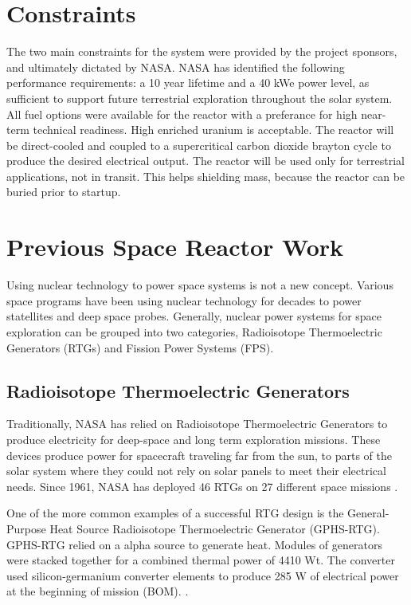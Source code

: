 \section{Constraints}
The two main constraints for the system were provided by the project sponsors,
and ultimately dictated by NASA. NASA has identified the following performance
requirements: a 10 year lifetime and a 40 kWe power level, as sufficient to
support future terrestrial exploration throughout the solar system. All fuel
options were available for the reactor with a preferance for high near-term
technical readiness. High enriched uranium is acceptable. The reactor will be direct-cooled and coupled to a
supercritical carbon dioxide brayton cycle to produce the desired electrical
output. The reactor will be used only for terrestrial applications, not in
transit. This helps shielding mass, because the reactor can be buried prior to
startup.

\section{Previous Space Reactor Work}
Using nuclear technology to power space systems is not a new concept. Various
space programs have been using nuclear technology for decades to power
statellites and deep space probes. Generally, nuclear power systems for space
exploration can be grouped into two categories, Radioisotope Thermoelectric
Generators (RTGs) and Fission Power Systems (FPS). 

\subsection{Radioisotope Thermoelectric Generators}
Traditionally, NASA has relied on Radioisotope Thermoelectric Generators to
produce electricity for deep-space and long term exploration missions. These
devices produce power for spacecraft traveling far from the sun, to parts of the
solar system where they could not rely on solar panels to meet their electrical
needs. Since 1961, NASA has deployed 46 RTGs on 27 different space missions
\citep{mmrtg_fact}.

One of the more common examples of a successful RTG design is the
General-Purpose Heat Source Radioisotope Thermoelectric Generator (GPHS-RTG).
GPHS-RTG relied on a \pu alpha source to generate heat. Modules of \pu
generators were stacked together for a combined thermal power of 4410 Wt. The
converter used silicon-germanium converter elements to produce 285 W of
electrical power at the beginning of mission (BOM).
\citep{bennett_mission_2006}. 


